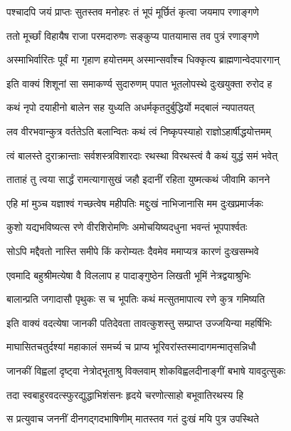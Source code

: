 \twolineshloka
{पश्चादपि जयं प्राप्तः सुतस्तव मनोहरः}
{तं भूपं मूर्छितं कृत्वा जयमाप रणाङ्गणे}%

\twolineshloka
{ततो मूर्च्छां विहायैष राजा परमदारुणः}
{सङ्कुप्य पातयामास तव पुत्रं रणाङ्गणे}%

\twolineshloka
{अस्माभिर्वारितः पूर्वं मा गृहाण हयोत्तमम्}
{अस्मान्सर्वांश्च धिक्कृत्य ब्राह्मणान्वेदपारगान्}%

\twolineshloka
{इति वाक्यं शिशूनां सा समाकर्ण्य सुदारुणम्}
{पपात भूतलोपस्थे दुःखयुक्ता रुरोद ह}%


\twolineshloka
{कथं नृपो दयाहीनो बालेन सह युध्यति}
{अधर्मकृतदुर्बुद्धिर्यो मद्बालं न्यपातयत्}%

\twolineshloka
{लव वीरभवान्कुत्र वर्ततेऽति बलान्वितः}
{कथं त्वं निष्कृपस्याहो राज्ञोऽहार्षीद्धयोत्तमम्}%

\twolineshloka
{त्वं बालस्ते दुराक्रान्ताः सर्वशस्त्रविशारदाः}
{रथस्था विरथस्त्वं वै कथं युद्धं समं भवेत्}%

\twolineshloka
{ताताहं तु त्वया सार्द्धं रामत्यागासुखं जहौ}
{इदानीं रहिता युष्मत्कथं जीवामि कानने}%

\twolineshloka
{एहि मां मुञ्च यज्ञाश्वं गच्छत्वेष महीपतिः}
{मद्दुःखं नाभिजानासि मम दुःखप्रमार्जकः}%

\twolineshloka
{कुशो यद्यभविष्यत्स रणे वीरशिरोमणिः}
{अमोचयिष्यदधुना भवन्तं भूपपार्श्वतः}%

\twolineshloka
{सोऽपि मद्दैवतो नास्ति समीपे किं करोम्यतः}
{दैवमेव ममाप्यत्र कारणं दुःखसम्भवे}%

\twolineshloka
{एवमादि बहुश्रीमत्येषा वै विललाप ह}
{पादाङ्गुष्ठेन लिखती भूमिं नेत्रद्वयाश्रुभिः}%

\twolineshloka
{बालान्प्रति जगादासौ पृथुकः स च भूपतिः}
{कथं मत्सुतमापात्य रणे कुत्र गमिष्यति}%

\twolineshloka
{इति वाक्यं वदत्येषा जानकी पतिदेवता}
{तावत्कुशस्तु सम्प्राप्त उज्जयिन्या महर्षिभिः}%

\twolineshloka
{माघासितचतुर्दश्यां महाकालं समर्च्य च}
{प्राप्य भूरिवरांस्तस्मादागमन्मातृसन्निधौ}%

\twolineshloka
{जानकीं विह्वलां दृष्ट्वा नेत्रोद्भूताश्रु विक्लवाम्}
{शोकविह्वलदीनाङ्गीं बभाषे यावदुत्सुकः}%

\twolineshloka
{तदा स्वबाहुरवदत्स्फुरद्युद्धाभिशंसनः}
{हृदये चरणोत्साहो बभूवातिरथस्य हि}%

\twolineshloka
{स प्रत्युवाच जननीं दीनगद्गदभाषिणीम्}
{मातस्तव गतं दुःखं मयि पुत्र उपस्थिते}%

